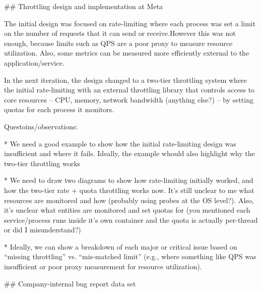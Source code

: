 ## Throttling design and implementation at Meta

The initial design was focused on rate-limiting where each process was set a limit on the number of requests that it can send or receive.However this was not enough, because limits such as QPS are a poor proxy to measure resource utilization. Also, some metrics can be measured more efficiently external to the application/service.

In the next iteration, the design changed to a two-tier throttling system where the initial rate-limiting with an external throttling library that controls access to core resources -- CPU, memory, network bandwidth (anything else?) -- by setting quotas for each process it monitors.

Questoins/observations:

* We need a good example to show how the initial rate-limiting design was insufficient and where it fails. Ideally, the example whould also highlight why the two-tier throttling works

* We need to draw two diagrams to show how rate-limiting initially worked, and how the two-tier rate + quota throttling works now. It's still unclear to me what resources are monitored and how (probably using probes at the OS level?). Also, it's unclear what entities are monitored and set quotas for (you mentioned each service/process runs inside it's own container and the quota is actually per-thread or did I misunderstand?)

* Ideally, we can show a breakdown of each major or critical issue based on ``missing throttling'' vs. ``mis-matched limit'' (e.g., where something like QPS was insufficient or poor proxy measurement for resource utilization).

## Company-internal bug report data set
